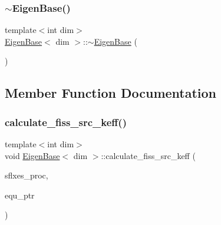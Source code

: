\subsubsection{\texorpdfstring{$\sim$\+Eigen\+Base()}{~EigenBase()}}
{\footnotesize\ttfamily template$<$int dim$>$ \\
\hyperlink{class_eigen_base}{Eigen\+Base}$<$ dim $>$\+::$\sim$\hyperlink{class_eigen_base}{Eigen\+Base} (\begin{DoxyParamCaption}{ }\end{DoxyParamCaption})\hspace{0.3cm}{\ttfamily [virtual]}}



\subsection{Member Function Documentation}
\mbox{\label{class_eigen_base_a325ceda011337e2416cef726bbd5d28f}} 
\subsubsection{\texorpdfstring{calculate\+\_\+fiss\+\_\+src\+\_\+keff()}{calculate\_fiss\_src\_keff()}}
{\footnotesize\ttfamily template$<$int dim$>$ \\
void \hyperlink{class_eigen_base}{Eigen\+Base}$<$ dim $>$\+::calculate\+\_\+fiss\+\_\+src\+\_\+keff (\begin{DoxyParamCaption}\item[{std\+::vector$<$ Vector$<$ double $>$ $>$ \&}]{sflxes\+\_\+proc,  }\item[{std\+\_\+cxx11\+::shared\+\_\+ptr$<$ \hyperlink{class_equation_base}{Equation\+Base}$<$ dim $>$ $>$}]{equ\+\_\+ptr }\end{DoxyParamCaption})\hspace{0.3cm}{\ttfamily [protected]}}

\mbox{\label{class_eigen_base_a8a9ef8878e5b7199aa662f2b61b2d864}} 
